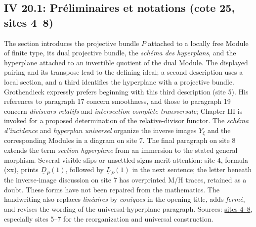 \subsection*{IV 20.1: Préliminaires et notations (cote 25, sites 4--8)}
The section introduces the projective bundle $P$ attached to a locally free Module of finite type, its dual projective bundle, the \emph{schéma des hyperplans}, and the hyperplane attached to an invertible quotient of the dual Module. The displayed pairing and its transpose lead to the defining ideal; a second description uses a local section, and a third identifies the hyperplane with a projective bundle. Grothendieck expressly prefers beginning with this third description (site 5). His references to paragraph 17 concern smoothness, and those to paragraph 19 concern \emph{diviseurs relatifs} and \emph{intersection complète transversale}; Chapter III is invoked for a proposed determination of the relative-divisor functor. The \emph{schéma d'incidence} and \emph{hyperplan universel} organize the inverse images $Y_{\xi}$ and the corresponding Modules in a diagram on site 7. The final paragraph on site 8 extends the term \emph{section hyperplane} from an immersion to the stated general morphism. Several visible slips or unsettled signs merit attention: site 4, formula (xx), prints $\underline{D}_P(1)$, followed by $\underline{L}_P(1)$ in the next sentence; the letter beneath the inverse-image discussion on site 7 has overprinted M/H traces, retained as a doubt. These forms have not been repaired from the mathematics. The handwriting also replaces \emph{linéaires} by \emph{coniques} in the opening title, adds \emph{fermé}, and revises the wording of the universal-hyperplane paragraph. Sources: \href{https://grothendieck.umontpellier.fr/web/viewer.html?file=../25.pdf\#page=5}{sites 4--8}, especially sites 5--7 for the reorganization and universal construction.
